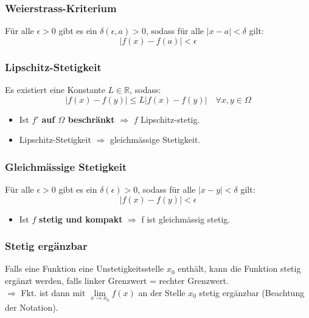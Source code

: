 \documentclass[6pt]{article}
\begin{document}
\begin{multicols*}{3}
\subsubsection*{Weierstrass-Kriterium}
\vspace{-2mm}
F{\"u}r alle $\epsilon > 0$ gibt es ein $\delta(\epsilon, a) >0$, sodass f{\"u}r alle $|x-a|<\delta$ gilt:
\begin{equation*}
	|f(x) -f(a)|<\epsilon
\end{equation*}

\subsubsection*{Lipschitz-Stetigkeit}
\vspace{-2mm}
Es existiert eine Konstante $L\in \mathbb{R}$, sodass:
\begin{equation*}
	|f(x)-f(y)|\leq L|f(x)-f(y)| \quad \forall x,y \in \Omega
\end{equation*}
\vspace{-3mm}
\begin{itemize}
	\item 	Ist $f'$ \textbf{auf $\Omega$ beschr{\"a}nkt} $\Rightarrow$ $f$ Lipschitz-stetig. 
	\item  Lipschitz-Stetigkeit $\Rightarrow$ gleichm{\"a}ssige Stetigkeit. 
\end{itemize}




	
\subsubsection*{Gleichm{\"a}ssige Stetigkeit}
\vspace{-2mm}
F{\"u}r alle $\epsilon > 0$ gibt es ein $\delta(\epsilon) >0$, sodass f{\"u}r alle $|x-y|<\delta$ gilt:
\begin{equation*}
	|f(x)-f(y)| < \epsilon
\end{equation*}
\vspace{-4mm}
\begin{itemize}
	\item Ist $f$ \textbf{stetig und kompakt} $\Rightarrow$ f ist gleichm{\"a}ssig stetig.
\end{itemize}


\subsubsection*{Stetig erg{\"a}nzbar}
\vspace{-2mm}
Falls eine Funktion eine Unstetigkeitsstelle $x_0$ enth{\"a}lt, kann die Funktion stetig erg{\"a}nzt werden, falls linker Grenzwert = rechter Grenzwert. \\
	$\Rightarrow$ Fkt. ist dann mit $\lim\limits_{x \to x_0} f(x)$ an der Stelle $x_0$ stetig erg{\"a}nzbar (Beachtung der Notation).
	


\end{multicols*}
\end{document}
